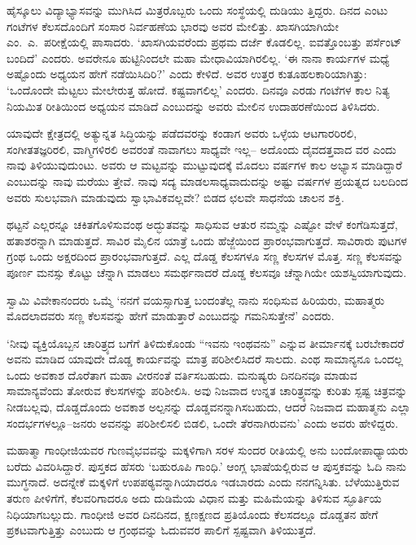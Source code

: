 ಹೈಸ್ಕೂಲು ವಿದ್ಯಾಭ್ಯಾಸವನ್ನು ಮುಗಿಸಿದ ಮಿತ್ರರೊಬ್ಬರು ಒಂದು ಸಂಸ್ಥೆಯಲ್ಲಿ ದುಡಿಯು ತ್ತಿದ್ದರು. ದಿನದ ಎಂಟು ಗಂಟೆಗಳ ಕೆಲಸದೊಂದಿಗೆ ಸಂಸಾರ ನಿರ್ವಹಣೆಯ ಭಾರವು ಅವರ ಮೇಲಿತ್ತು. ಖಾಸಗಿಯಾಗಿಯೇ ಎಂ.\ ಎ.\ ಪರೀಕ್ಷೆಯಲ್ಲಿ ಪಾಸಾದರು. ‘ಖಾಸಗಿಯವರೆಂದು ಪ್ರಥಮ ದರ್ಜೆ ಕೊಡಲಿಲ್ಲ. ಐವತ್ತೊಂಬತ್ತು ಪರ್ಸೆಂಟ್ ಬಂದಿದೆ’ ಎಂದರು. ಅವರೇನೂ ಹುಟ್ಟಿನಿಂದಲೇ ಮಹಾ ಮೇಧಾವಿಯಾಗಿರಲಿಲ್ಲ. ‘ಈ ನಾನಾ ಕಾರ್ಯಗಳ ಮಧ್ಯೆ ಅಷ್ಟೊಂದು ಅಧ್ಯಯನ ಹೇಗೆ ನಡೆಯಿಸಿದಿರಿ?’ ಎಂದು ಕೇಳಿದೆ. ಅವರ ಉತ್ತರ ಕುತೂಹಲಕಾರಿಯಾಗಿತ್ತು: ‘ಒಂದೊಂದೇ ಮೆಟ್ಟಲು ಮೇಲೇರುತ್ತ ಹೋದೆ. ಕಷ್ಟವಾಗಲಿಲ್ಲ’ ಎಂದರು. ದಿನವೂ ಎರಡು ಗಂಟೆಗಳ ಕಾಲ ನಿತ್ಯ ನಿಯಮಿತ ರೀತಿಯಿಂದ ಅಧ್ಯಯನ ಮಾಡಿದೆ ಎಂಬುದನ್ನು ಅವರು ಮೇಲಿನ ಉದಾಹರಣೆಯಿಂದ ತಿಳಿಸಿದರು.

ಯಾವುದೇ ಕ್ಷೇತ್ರದಲ್ಲಿ ಅತ್ಯುನ್ನತ ಸಿದ್ಧಿಯನ್ನು ಪಡೆದವರನ್ನು ಕಂಡಾಗ ಅವರು ಒಳ್ಳೆಯ ಆಟಗಾರರಿರಲಿ, ಸಂಗೀತತಜ್ಞರಿರಲಿ, ವಾಗ್ಮಿಗಳಿರಲಿ ಅವರಂತೆ ನಾವಾಗಲು ಸಾಧ್ಯವೇ ಇಲ್ಲ– ಅದೊಂದು ದೈವದತ್ತವಾದ ವರ ಎಂದು ನಾವು ತಿಳಿಯುವುದುಂಟು. ಅವರು ಆ ಮಟ್ಟವನ್ನು ಮುಟ್ಟುವುದಕ್ಕೆ ಮೊದಲು ವರ್ಷಗಳ ಕಾಲ ಅಭ್ಯಾಸ ಮಾಡಿದ್ದಾರೆ ಎಂಬುದನ್ನು ನಾವು ಮರೆಯು ತ್ತೇವೆ. ನಾವು ಸದ್ಯ ಮಾಡಲಸಾಧ್ಯವಾದುದನ್ನು ಅಷ್ಟು ವರ್ಷಗಳ ಪ್ರಯತ್ನದ ಬಲದಿಂದ ಅವರು ಸುಲಭವಾಗಿ ಮಾಡುವುದು ಸ್ವಾಭಾವಿಕವಲ್ಲವೇ? ಬಿಡದ ಛಲವೇ ಸಾಧನೆಯ ಚಾಲನ ಶಕ್ತಿ.

ಥಟ್ಟನೆ ಎಲ್ಲರನ್ನೂ ಚಕಿತಗೊಳಿಸುವಂಥ ಅದ್ಭುತವನ್ನು ಸಾಧಿಸುವ ಆತುರ ನಮ್ಮನ್ನು ಎಷ್ಟೋ ವೇಳೆ ಕಂಗೆಡಿಸುತ್ತದೆ, ಹತಾಶರನ್ನಾಗಿ ಮಾಡುತ್ತದೆ. ಸಾವಿರ ಮೈಲಿನ ಯಾತ್ರೆ ಒಂದು ಹೆಜ್ಜೆಯಿಂದ ಪ್ರಾರಂಭವಾಗುತ್ತದೆ. ಸಾವಿರಾರು ಪುಟಗಳ ಗ್ರಂಥ ಒಂದು ಅಕ್ಷರದಿಂದ ಪ್ರಾರಂಭವಾಗುತ್ತದೆ. ಎಲ್ಲ ದೊಡ್ಡ ಕೆಲಸಗಳೂ ಸಣ್ಣ ಕೆಲಸಗಳ ಮೊತ್ತ. ಸಣ್ಣ ಕೆಲಸವನ್ನು ಪೂರ್ಣ ಮನಸ್ಸು ಕೊಟ್ಟು ಚೆನ್ನಾಗಿ ಮಾಡಲು ಸಮರ್ಥನಾದರೆ ದೊಡ್ಡ ಕೆಲಸವೂ ಚೆನ್ನಾಗಿಯೇ ಯಶಸ್ವಿಯಾಗುವುದು.

ಸ್ವಾಮಿ ವಿವೇಕಾನಂದರು ಒಮ್ಮೆ ‘ನನಗೆ ವಯಸ್ಸಾಗುತ್ತ ಬಂದಂತೆಲ್ಲ ನಾನು ಸಂಧಿಸುವ ಹಿರಿಯರು, ಮಹಾತ್ಮರು ಮೊದಲಾದವರು ಸಣ್ಣ ಕೆಲಸವನ್ನು ಹೇಗೆ ಮಾಡುತ್ತಾರೆ ಎಂಬುದನ್ನು ಗಮನಿಸುತ್ತೇನೆ’ ಎಂದರು.

‘ನೀವು ವ್ಯಕ್ತಿಯೊಬ್ಬನ ಚಾರಿತ್ರ್ಯದ ಬಗೆಗೆ ತಿಳಿದುಕೊಂಡು “ಇವನು ಇಂಥವನು” ಎನ್ನುವ ತೀರ್ಮಾನಕ್ಕೆ ಬರಬೇಕಾದರೆ ಅವನು ಮಾಡಿದ ಯಾವುದೇ ದೊಡ್ಡ ಕಾರ್ಯವನ್ನು ಮಾತ್ರ ಪರಿಶೀಲಿಸಿದರೆ ಸಾಲದು. ಎಂಥ ಸಾಮಾನ್ಯನೂ ಒಂದಲ್ಲ ಒಂದು ಅವಕಾಶ ದೊರೆತಾಗ ಮಹಾ ವೀರನಂತೆ ವರ್ತಿಸಬಹುದು. ಮನುಷ್ಯರು ದಿನದಿನವೂ ಮಾಡುವ ಸಾಮಾನ್ಯವೆಂದು ತೋರುವ ಕೆಲಸಗಳನ್ನು ಪರಿಶೀಲಿಸಿ. ಅವು ನಿಜವಾದ ಉನ್ನತ ಚಾರಿತ್ರ್ಯವನ್ನು ಕುರಿತು ಸ್ಪಷ್ಟ ಚಿತ್ರವನ್ನು ನೀಡಬಲ್ಲವು, ದೊಡ್ಡದೊಂದು ಅವಕಾಶ ಅಲ್ಪನನ್ನು ದೊಡ್ಡವನನ್ನಾಗಿಸಬಹುದು, ಆದರೆ ನಿಜವಾದ ಮಹಾತ್ಮನು ಎಲ್ಲಾ ಸಂದರ್ಭಗಳಲ್ಲೂ–ಜನರು ಅವನನ್ನು ಪರಿಶೀಲಿಸಲಿ ಬಿಡಲಿ, ಒಂದೇ ತೆರನಾಗಿರುವನು’ ಎಂದು ಅವರು ಹೇಳಿದ್ದರು.

ಮಹಾತ್ಮಾ ಗಾಂಧೀಜಿಯವರ ಗುಣವೈಭವವನ್ನು ಮಕ್ಕಳಿಗಾಗಿ ಸರಳ ಸುಂದರ ರೀತಿಯಲ್ಲಿ ಅನು ಬಂದೋಪಾಧ್ಯಾಯರು ಬರೆದು ವಿವರಿಸಿದ್ದಾರೆ. ಪುಸ್ತಕದ ಹೆಸರು ‘ಬಹುರೂಪಿ ಗಾಂಧಿ.’ ಆಂಗ್ಲ ಭಾಷೆಯಲ್ಲಿರುವ ಆ ಪುಸ್ತಕವನ್ನು ಓದಿ ನಾನು ಮುಗ್ಧನಾದೆ. ಅದನ್ನೇಕೆ ಮಕ್ಕಳಿಗೆ ಉಪಪಠ್ಯವನ್ನಾಗಿಯಾದರೂ ಇಡಬಾರದು ಎಂದು ನನಗನ್ನಿಸಿತು. ಬೆಳೆಯುತ್ತಿರುವ ತರುಣ ಪೀಳಿಗೆಗೆ, ಕೆಲವರಿಗಾದರೂ ಅದು ದುಡಿಮೆಯ ವಿಧಾನ ಮತ್ತು ಮಹಿಮೆಯನ್ನು ತಿಳಿಸುವ ಸ್ಫೂರ್ತಿಯ ನಿಧಿಯಾಗಬಲ್ಲುದು. ಗಾಂಧೀಜಿ ಅವರ ದಿನದಿನದ, ಕ್ಷಣಕ್ಷಣದ ಪ್ರತಿಯೊಂದು ಕೆಲಸದಲ್ಲೂ ದೊಡ್ಡತನ ಹೇಗೆ ಪ್ರಕಟವಾಗುತ್ತಿತ್ತು ಎಂಬುದು ಆ ಗ್ರಂಥವನ್ನು ಓದುವವರ ಪಾಲಿಗೆ ಸ್ಪಷ್ಟವಾಗಿ ತಿಳಿಯುತ್ತದೆ.

